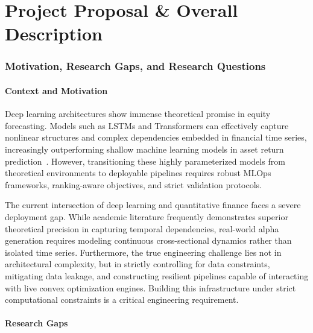\documentclass[twoside,final]{hcmut-report}
\begin{document}
\fancyfoot{}
\coverpage\clearpage

\tableofcontents\clearpage
\listoftables\listoffigures\clearpage

\setcounter{page}{1}

\part{Project Proposal \& Overall Description}
\section{Motivation, Research Gaps, and Research Questions}

\subsection{Context and Motivation}

Deep learning architectures show immense theoretical promise in equity forecasting. Models such as LSTMs and Transformers can effectively capture nonlinear structures and complex dependencies embedded in financial time series, increasingly outperforming shallow machine learning models in asset return prediction~\cite{Ellery2025}. However, transitioning these highly parameterized models from theoretical environments to deployable pipelines requires robust MLOps frameworks, ranking-aware objectives, and strict validation protocols.

The current intersection of deep learning and quantitative finance faces a severe deployment gap. While academic literature frequently demonstrates superior theoretical precision in capturing temporal dependencies, real-world alpha generation requires modeling continuous cross-sectional dynamics rather than isolated time series. Furthermore, the true engineering challenge lies not in architectural complexity, but in strictly controlling for data constraints, mitigating data leakage, and constructing resilient pipelines capable of interacting with live convex optimization engines. Building this infrastructure under strict computational constraints is a critical engineering requirement.

\subsection{Research Gaps}
\end{document}
